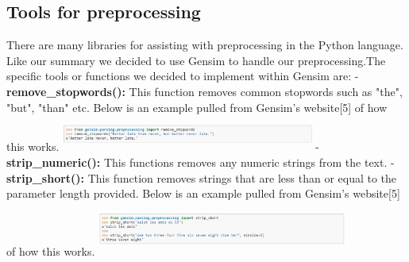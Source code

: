 \documentclass[11pt,a4paper]{article}
\begin{document}
\subsection{Tools for preprocessing}
There are many libraries for assisting with preprocessing in the Python language. Like our summary we decided to use Gensim to handle our preprocessing.The specific tools or functions we decided to implement within Gensim are:
\newline\newline
\noindent-\textbf{remove\_stopwords():} This function removes common stopwords such as "the", "but", "than" etc. Below is an example pulled from Gensim's website[5] of how this works.
\newline
\includegraphics[width=8.30cm, height=1.2cm]{figs/remove_stopwords.PNG}
\newline\newline
-\textbf{strip\_numeric():} This functions removes any numeric strings from the text.
\newline\newline
-\textbf{strip\_short():} This function removes strings that are less than or equal to the parameter length provided. Below is an example pulled from Gensim's website[5] of how this works.
\newline
\includegraphics[width=8.2cm, height=1.8cm]{figs/strip_short.PNG}
\end{document}
